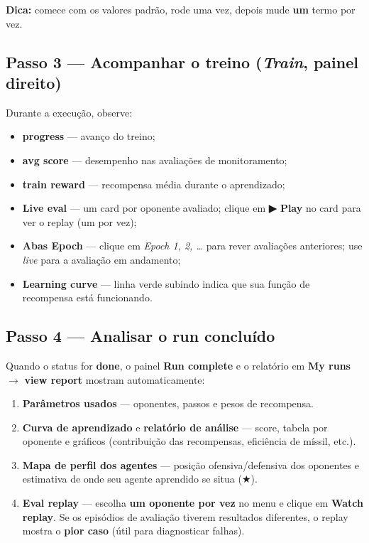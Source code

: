 \documentclass[11pt,a4paper]{article}
\begin{document}
\textbf{Dica:} comece com os valores padrão, rode uma vez, depois mude \textbf{um} termo por vez.

\subsection*{Passo 3 — Acompanhar o treino (\emph{Train}, painel direito)}
Durante a execução, observe:
\begin{itemize}[nosep]
  \item \textbf{progress} — avanço do treino;
  \item \textbf{avg score} — desempenho nas avaliações de monitoramento;
  \item \textbf{train reward} — recompensa média durante o aprendizado;
  \item \textbf{Live eval} — um card por oponente avaliado; clique em \textbf{▶ Play} no card para ver o replay (um por vez);
  \item \textbf{Abas Epoch} — clique em \emph{Epoch 1, 2, \ldots} para rever avaliações anteriores; use \emph{live} para a avaliação em andamento;
  \item \textbf{Learning curve} — linha verde subindo indica que sua função de recompensa está funcionando.
\end{itemize}

\subsection*{Passo 4 — Analisar o run concluído}
Quando o status for \textbf{done}, o painel \textbf{Run complete} e o relatório em \textbf{My runs} $\rightarrow$ \textbf{view report} mostram automaticamente:
\begin{enumerate}[label=\textbf{\arabic*.},start=7]
  \item \textbf{Parâmetros usados} — oponentes, passos e pesos de recompensa.
  \item \textbf{Curva de aprendizado} e \textbf{relatório de análise} — score, tabela por oponente e gráficos (contribuição das recompensas, eficiência de míssil, etc.).
  \item \textbf{Mapa de perfil dos agentes} — posição ofensiva/defensiva dos oponentes e estimativa de onde seu agente aprendido se situa (★).
  \item \textbf{Eval replay} — escolha \textbf{um oponente por vez} no menu e clique em \textbf{Watch replay}. Se os episódios de avaliação tiverem resultados diferentes, o replay mostra o \textbf{pior caso} (útil para diagnosticar falhas).
\end{enumerate}
\end{document}
